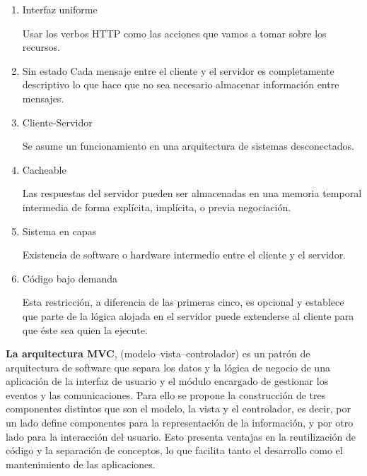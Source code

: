 \documentclass[a4paper,twocolumn,12pt]{article}
\begin{document}
\begin{enumerate}

	\item Interfaz uniforme
    
	    	Usar los verbos HTTP como las acciones que vamos a tomar sobre los recursos.
        
    \item Sin estado
            Cada mensaje entre el cliente y el servidor es completamente descriptivo lo que hace que no sea necesario almacenar información entre mensajes.
            
    \item Cliente-Servidor
    
    		Se asume un funcionamiento en una arquitectura de sistemas desconectados.
            
    \item Cacheable
    
    		Las respuestas del servidor pueden ser almacenadas en una memoria temporal intermedia de forma explícita, implícita, o previa negociación.
            
    \item Sistema en capas
    		
            Existencia de software o hardware intermedio entre el cliente y el servidor.
            
    \item Código bajo demanda
    
    		Esta restricción, a diferencia de las primeras cinco, es opcional y establece que parte de la lógica alojada en el servidor puede extenderse al cliente para que éste sea quien la ejecute.
            
\end{enumerate}

\textbf{La arquitectura MVC},
(modelo–vista–controlador) es un patrón de arquitectura de software que separa los datos y la lógica de negocio de una aplicación de la interfaz de usuario y el módulo encargado de gestionar los eventos y las comunicaciones. Para ello se propone la construcción de tres componentes distintos que son el modelo, la vista y el controlador, es decir, por un lado define componentes para la representación de la información, y por otro lado para la interacción del usuario. Esto presenta ventajas en la reutilización de código y la separación de conceptos, lo que facilita tanto el desarrollo como el mantenimiento de las aplicaciones.\cite{wiki:mvc}
\end{document}
